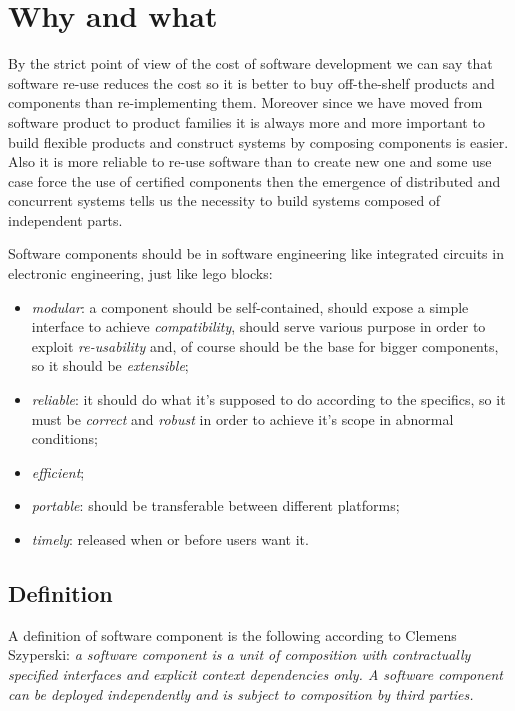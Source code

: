 \section{Why and what}
By the strict point of view of the cost of software development we can say that software re-use reduces the cost so it is better to buy off-the-shelf products and components than re-implementing them.
Moreover since we have moved from software product to product families it is always more and more important to build flexible products and construct systems by composing components is easier.
Also it is more reliable to re-use software than to create new one and some use case force the use of certified components then the emergence of distributed and concurrent systems tells us the necessity to build systems composed of independent parts.

Software components should be in software engineering like integrated circuits in electronic engineering, just like lego blocks:
\begin{itemize}
    \item \emph{modular}: a component should be self-contained, should expose a simple interface to achieve \emph{compatibility}, should serve various purpose in order to exploit \emph{re-usability} and, of course should be the base for bigger components, so it should be \emph{extensible};
    
    \item \emph{reliable}: it should do what it's supposed to do according to the specifics, so it must be \emph{correct} and \emph{robust} in order to achieve it's scope in abnormal conditions;
    
    \item \emph{efficient};
    \item \emph{portable}: should be transferable between different platforms;
    \item \emph{timely}: released when or before users want it.
\end{itemize}

\subsection{Definition}
A definition of software component is the following according to Clemens Szyperski: \emph{a software component is a unit of composition with contractually specified interfaces and explicit context dependencies only.
A software component can be deployed independently and is subject to composition by third parties.}

